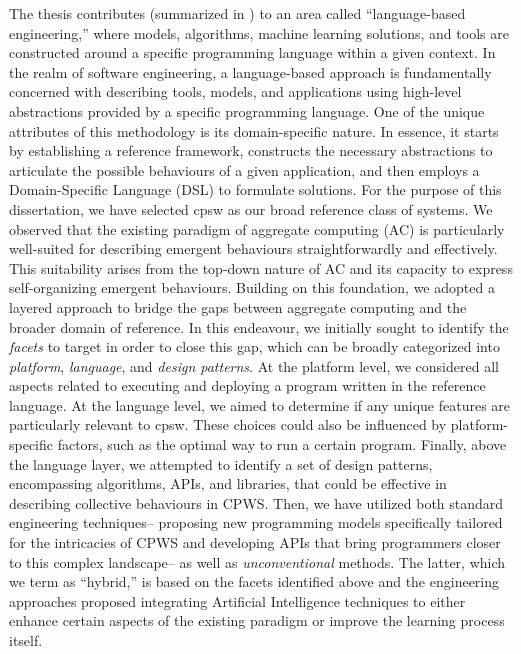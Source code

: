 \begin{refsection}
The thesis contributes (summarized in ) to an area called ``language-based engineering,'' where models, algorithms, machine learning solutions, and tools are constructed around a specific programming language within a given context.
In the realm of software engineering, 
 a language-based approach is fundamentally concerned with describing tools, models, and applications using high-level abstractions provided by a specific programming language. 
 One of the unique attributes of this methodology is its domain-specific nature. 
 In essence, it starts by establishing a reference framework, 
 constructs the necessary abstractions to articulate the possible behaviours of a given application, 
 and then employs a Domain-Specific Language (DSL) to formulate solutions.
%
For the purpose of this dissertation, 
 we have selected \ac{cpsw} as our broad reference class of systems. 
 We observed that the existing paradigm of aggregate computing (AC) 
 is particularly well-suited for describing emergent behaviours straightforwardly and effectively. This suitability arises from the top-down nature of AC and its capacity to express self-organizing emergent behaviours.
%
Building on this foundation, 
 we adopted a layered approach to bridge the gaps between aggregate computing and the broader domain of reference. 
 In this endeavour, 
 we initially sought to identify the \emph{facets} to target in order to close this gap, 
 which can be broadly categorized into \emph{platform}, \emph{language}, and \emph{design patterns}. 
 At the platform level, 
 we considered all aspects related to executing and deploying a program written in the reference language. 
 At the language level, we aimed to determine if any unique features are particularly relevant to \ac{cpsw}. 
 These choices could also be influenced by platform-specific factors, 
 such as the optimal way to run a certain program. 
 Finally, above the language layer, 
 we attempted to identify a set of design patterns, encompassing algorithms, APIs, and libraries, 
 that could be effective in describing collective behaviours in CPWS.
 Then, we have utilized both standard engineering techniques--
 proposing new programming models specifically tailored for the intricacies of CPWS and developing APIs that bring programmers closer to this complex landscape--
 as well as \emph{unconventional} methods. 
 The latter, which we term as ``hybrid,'' 
 is based on the facets identified above and the engineering approaches proposed
 integrating Artificial Intelligence techniques 
 to either enhance certain aspects of the existing paradigm or improve the learning process itself.

\end{refsection}
